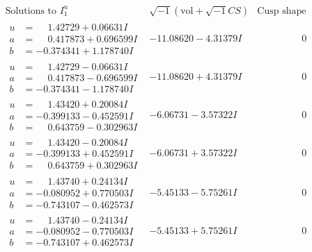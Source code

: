 \documentclass[1p]{elsarticle_modified}
\theoremstyle{definition}
\newcommand{\I}{\sqrt{-1}}
\begin{document}
$$\begin{array}{c|c|c}
 \end{array}$$\newpage$$\begin{array}{c|c|c}  
\text{Solutions to }I^u_{1}& \I (\text{vol} + \sqrt{-1}CS) & \text{Cusp shape}\\
 \hline 
\begin{aligned}
u &= \phantom{-}1.42729 + 0.06631 I \\
a &= \phantom{-}0.417873 + 0.696599 I \\
b &= -0.374341 + 1.178740 I\end{aligned}
 & -11.08620 - 4.31379 I & \phantom{-0.000000 } 0 \\ \hline\begin{aligned}
u &= \phantom{-}1.42729 - 0.06631 I \\
a &= \phantom{-}0.417873 - 0.696599 I \\
b &= -0.374341 - 1.178740 I\end{aligned}
 & -11.08620 + 4.31379 I & \phantom{-0.000000 } 0 \\ \hline\begin{aligned}
u &= \phantom{-}1.43420 + 0.20084 I \\
a &= -0.399133 - 0.452591 I \\
b &= \phantom{-}0.643759 - 0.302963 I\end{aligned}
 & -6.06731 - 3.57322 I & \phantom{-0.000000 } 0 \\ \hline\begin{aligned}
u &= \phantom{-}1.43420 - 0.20084 I \\
a &= -0.399133 + 0.452591 I \\
b &= \phantom{-}0.643759 + 0.302963 I\end{aligned}
 & -6.06731 + 3.57322 I & \phantom{-0.000000 } 0 \\ \hline\begin{aligned}
u &= \phantom{-}1.43740 + 0.24134 I \\
a &= -0.080952 + 0.770503 I \\
b &= -0.743107 - 0.462573 I\end{aligned}
 & -5.45133 - 5.75261 I & \phantom{-0.000000 } 0 \\ \hline\begin{aligned}
u &= \phantom{-}1.43740 - 0.24134 I \\
a &= -0.080952 - 0.770503 I \\
b &= -0.743107 + 0.462573 I\end{aligned}
 & -5.45133 + 5.75261 I & \phantom{-0.000000 } 0 \\ \hline\begin{aligned}

\end{aligned}
\end{array}$$
\end{document}
